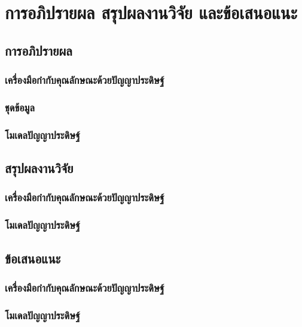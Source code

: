 
\chapter{การอภิปรายผล สรุปผลงานวิจัย และข้อเสนอแนะ}

\section{การอภิปรายผล}
\subsection{เครื่องมือกำกับคุณลักษณะด้วยปัญญาประดิษฐ์}

\subsection{ชุดข้อมูล}

\subsection{โมเดลปัญญาประดิษฐ์}



\section{สรุปผลงานวิจัย}
\subsection{เครื่องมือกำกับคุณลักษณะด้วยปัญญาประดิษฐ์}

\subsection{โมเดลปัญญาประดิษฐ์}


\section{ข้อเสนอแนะ}
\subsection{เครื่องมือกำกับคุณลักษณะด้วยปัญญาประดิษฐ์}

\subsection{โมเดลปัญญาประดิษฐ์}

